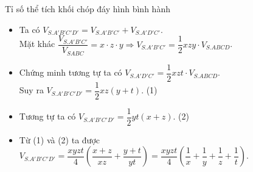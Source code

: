 \begin{dang}{Tỉ số thể tích khối chóp đáy hình bình hành}
{}
	\begin{itemize}
		\item Ta có  $V_{S.A'B'C'D'}=V_{S.A'B'C'}+V_{S.A'D'C'}$.\\
		Mặt khác 	 
		$\dfrac{V_{S.A'B'C'}}{V_{SABC}}=x\cdot z\cdot y \Rightarrow V_{S.A'B'C'}=\dfrac{1}{2}xzy\cdot V_{S.ABCD}$.\\
		\item Chứng minh tương tự ta có $ V_{S.A'D'C'}=\dfrac{1}{2}xzt\cdot V_{S.ABCD}$.\\
		Suy ra  $V_{S.A'B'C'D'}=\dfrac{1}{2}xz(y+t)$.  (1)
		\item Tương tự ta có $V_{S.A'B'C'D'}=\dfrac{1}{2}yt(x+z)$.  (2)\\
		\item Từ (1) và (2) ta được $ V_{S.A'B'C'D'}=\dfrac{xyzt}{4}\left(\dfrac{x+z}{xz}+\dfrac{y+t}{yt}\right) =\dfrac{xyzt}{4}\left(\dfrac{1}{x}+\dfrac{1}{y}+\dfrac{1}{z}+\dfrac{1}{t}\right)$.
	\end{itemize}	
\end{dang}
